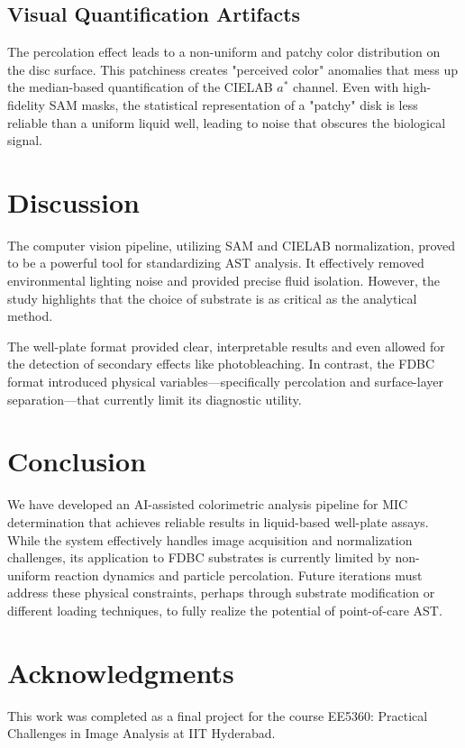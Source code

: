 \documentclass[conference]{IEEEtran}
\begin{document}
\subsection{Visual Quantification Artifacts}
The percolation effect leads to a non-uniform and patchy color distribution on the disc surface. This patchiness creates "perceived color" anomalies that mess up the median-based quantification of the CIELAB $a^*$ channel. Even with high-fidelity SAM masks, the statistical representation of a "patchy" disk is less reliable than a uniform liquid well, leading to noise that obscures the biological signal.

\section{Discussion}
The computer vision pipeline, utilizing SAM and CIELAB normalization, proved to be a powerful tool for standardizing AST analysis. It effectively removed environmental lighting noise and provided precise fluid isolation. However, the study highlights that the choice of substrate is as critical as the analytical method. 

The well-plate format provided clear, interpretable results and even allowed for the detection of secondary effects like photobleaching. In contrast, the FDBC format introduced physical variables---specifically percolation and surface-layer separation---that currently limit its diagnostic utility.

\section{Conclusion}
We have developed an AI-assisted colorimetric analysis pipeline for MIC determination that achieves reliable results in liquid-based well-plate assays. While the system effectively handles image acquisition and normalization challenges, its application to FDBC substrates is currently limited by non-uniform reaction dynamics and particle percolation. Future iterations must address these physical constraints, perhaps through substrate modification or different loading techniques, to fully realize the potential of point-of-care AST.

\section{Acknowledgments}
This work was completed as a final project for the course EE5360: Practical Challenges in Image Analysis at IIT Hyderabad.
\end{document}
